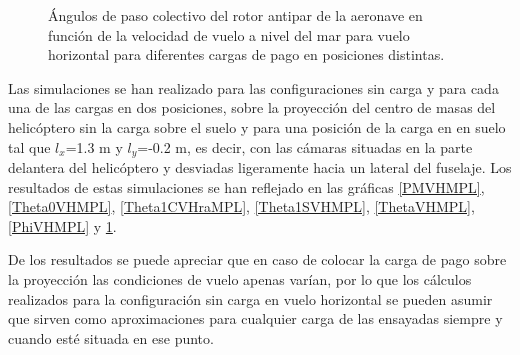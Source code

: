 \begin{figure}
	\centering
	\caption{Ángulos de paso colectivo del rotor antipar de la aeronave en función de la velocidad de vuelo a nivel del mar para vuelo horizontal para diferentes cargas de pago en posiciones distintas.}
	\label{Theta0VHraMPL}
\end{figure}

Las simulaciones se han realizado para las configuraciones sin carga y para cada una de las cargas en dos posiciones, sobre la proyección del centro de masas del helicóptero sin la carga sobre el suelo y para una posición de la carga en en suelo tal que $l_x$=1.3 m y $l_y$=-0.2 m, es decir, con las cámaras situadas en la parte delantera del helicóptero y desviadas ligeramente hacia un lateral del fuselaje. Los resultados de estas simulaciones se han reflejado en las gráficas \ref{PMVHMPL}, \ref{Theta0VHMPL}, \ref{Theta1CVHraMPL}, \ref{Theta1SVHMPL}, \ref{ThetaVHMPL}, \ref{PhiVHMPL} y \ref{Theta0VHraMPL}.

De los resultados se puede apreciar que en caso de colocar la carga de pago sobre la proyección las condiciones de vuelo apenas varían, por lo que los cálculos realizados para la configuración sin carga en vuelo horizontal se pueden asumir que sirven como aproximaciones para cualquier carga de las ensayadas siempre y cuando esté situada en ese punto.

